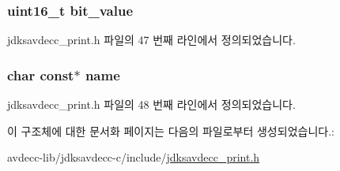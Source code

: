 \subsubsection[{\texorpdfstring{bit\+\_\+value}{bit_value}}]{\setlength{\rightskip}{0pt plus 5cm}uint16\+\_\+t bit\+\_\+value}\hypertarget{structjdksavdecc__16bit__name_ab84f0fb74ca7d1faeddf2c11cb72d037}{}\label{structjdksavdecc__16bit__name_ab84f0fb74ca7d1faeddf2c11cb72d037}


jdksavdecc\+\_\+print.\+h 파일의 47 번째 라인에서 정의되었습니다.

\subsubsection[{\texorpdfstring{name}{name}}]{\setlength{\rightskip}{0pt plus 5cm}char const$\ast$ name}\hypertarget{structjdksavdecc__16bit__name_a5f1de76dd5d451949e12c0fbc966ca70}{}\label{structjdksavdecc__16bit__name_a5f1de76dd5d451949e12c0fbc966ca70}


jdksavdecc\+\_\+print.\+h 파일의 48 번째 라인에서 정의되었습니다.



이 구조체에 대한 문서화 페이지는 다음의 파일로부터 생성되었습니다.\+:\begin{DoxyCompactItemize}
\item 
avdecc-\/lib/jdksavdecc-\/c/include/\hyperlink{jdksavdecc__print_8h}{jdksavdecc\+\_\+print.\+h}\end{DoxyCompactItemize}
